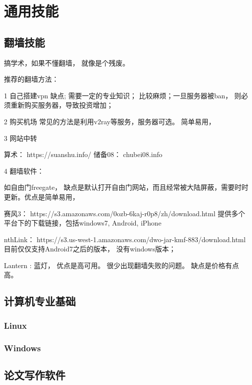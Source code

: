 \chapter{通用技能}

\section{翻墙技能}

搞学术，如果不懂翻墙， 就像是个残废。

推荐的翻墙方法：

1  自己搭建vpn 
  缺点; 需要一定的专业知识； 比较麻烦；一旦服务器被ban， 则必须重新购买服务器，导致投资增加；
  
2  购买机场
  常见的方法是利用v2ray等服务，服务器可选。
   简单易用，
  
3  网站中转

   算术：     https://suanshu.info/
   储备08：    chubei08.info 
   
4 翻墙软件：

   如自由门freegate， 缺点是默认打开自由门网站，而且经常被大陆屏蔽，需要时时更新。优点是简单易用，

   赛风3：   https://s3.amazonaws.com/0ozb-6kaj-r0p8/zh/download.html 
        提供多个平台下的下载链接，包括windows7,  Android,  iPhone
   
    nthLink：   https://s3.us-west-1.amazonaws.com/dwo-jar-kmf-883/download.html
           目前仅仅支持Android7之后的版本， 
           没有windows版本； 
    
    Lantern : 蓝灯，  优点是高可用。 很少出现翻墙失败的问题。 缺点是价格有点高。

\section{计算机专业基础}


\subsection{Linux }
\subsection{Windows}




\section{论文写作软件 }


